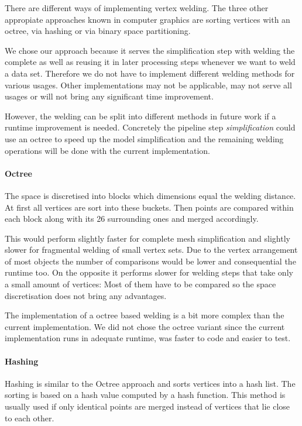 \documentclass[../ClassicThesis.tex]{subfiles}
\begin{document}
There are different ways of implementing vertex welding. The three other appropiate approaches known in computer graphics are sorting vertices with an octree, via hashing or via binary space partitioning.

We chose our approach because it serves the simplification step with welding the complete {\threedmodel} as well as reusing it in later processing steps whenever we want to weld a data set. Therefore we do not have to implement different welding methods for various usages. Other implementations may not be applicable, may not serve all usages or will not bring any significant time improvement.

However, the welding can be split into different methods in future work if a runtime improvement is needed. Concretely the pipeline step \emph{simplification} could use an octree to speed up the model simplification and the remaining welding operations will be done with the current implementation.

\paragraph{Octree}

The space is discretised into blocks which dimensions equal the welding distance. At first all vertices are sort into these buckets. Then points are compared within each block along with its 26 surrounding ones and merged accordingly.

This would perform slightly faster for complete mesh simplification and slightly slower for fragmental welding of small vertex sets. Due to the vertex arrangement of most objects the number of comparisons would be lower and consequential the runtime too. On the opposite it performs slower for welding steps that take only a small amount of vertices: Most of them have to be compared so the space discretisation does not bring any advantages.

The implementation of a octree based welding is a bit more complex than the current implementation. We did not chose the octree variant since the current implementation runs in adequate runtime, was faster to code and easier to test.

\paragraph{Hashing}

Hashing is similar to the Octree approach and sorts vertices into a hash list. The sorting is based on a hash value computed by a hash function. This method is usually used if only identical points are merged instead of vertices that lie close to each other.
\end{document}
